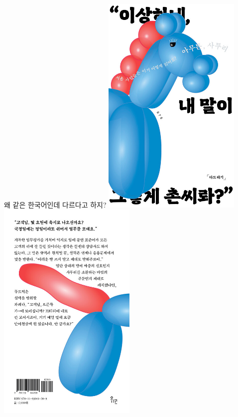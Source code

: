 \documentclass[11pt, aspectratio=169]{beamer}
\begin{document}
\begin{frame}[t]{}
  \begin{block}{왜 같은 한국어인데 다르다고 하지?}
    \includegraphics[width=0.5\textwidth]{img/K812933112_f.jpg}\includegraphics[width=0.5\textwidth]{img/K812933112_b.jpg}    
  \end{block}
\end{frame}
\end{document}
